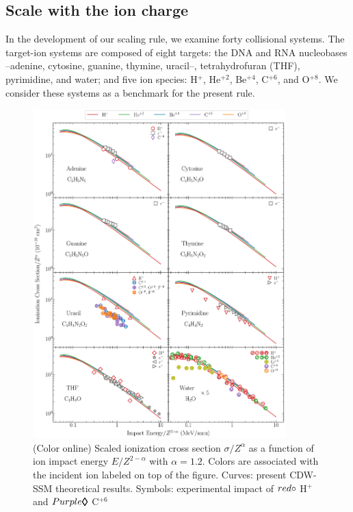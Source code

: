 \documentclass[10pt,showpacs,showkeys,twocolumn]{revtex4-1}
\begin{document}
\subsection{Scale with the ion charge}
\label{sec:zscaling}

In the development of our scaling rule, we examine forty collisional 
systems. The target-ion systems are composed of eight targets: 
the DNA and RNA nucleobases --adenine, cytosine, guanine, thymine, 
uracil--, tetrahydrofuran (THF), pyrimidine, and water; and five ion 
species: H$^+$, He$^{+2}$, Be$^{+4}$, C$^{+6}$, and O$^{+8}$. 
We consider these systems as a benchmark for the present rule. 

\begin{figure}[!htb]
\centering
\includegraphics[width=0.87\textwidth]{zscale_alpha.eps}
\caption{(Color online) Scaled ionization cross section $\sigma/Z^{\alpha}$ 
as a function of ion impact energy $E/Z^{2-\alpha}$ with $\alpha=1.2$. 
Colors are associated with the incident ion labeled on top of the figure. 
Curves: present CDW-SSM theoretical results. Symbols: experimental 
impact of \mbox{\LARGE$\color{red}\circ$} H$^+$~\cite{iriki2011} and
{\fontsize{11}{20}$\color{Purple}\pmb{\lozenge}$} C$^{+6}$ 
}
\end{figure}
\end{document}

